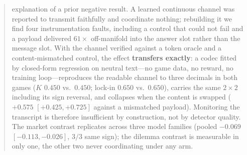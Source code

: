 \begin{abstract}
explanation of a prior negative result. A learned continuous channel was reported to
transmit faithfully and coordinate nothing; rebuilding it we find four instrumentation
faults, including a control that could not fail and a payload delivered $61\times$
off-manifold into the answer slot rather than the message slot. With the channel
verified against a token oracle and a content-mismatched control, the effect
\textbf{transfers exactly}: a codec fitted by closed-form regression on neutral
text---no game data, no reward, no training loop---reproduces the readable channel to
three decimals in both games ($K$ $0.450$ vs.\ $0.450$; lock-in $0.650$ vs.\ $0.650$),
carries the same $2\times2$ including its sign reversal, and collapses when the content
is swapped ($+0.575$ $[+0.425,+0.725]$ against a mismatched payload). Monitoring the
transcript is therefore insufficient by construction, not by detector quality. The
market contrast replicates across three model families (pooled $-0.069$
$[-0.113,-0.026]$, $3/3$ same sign); the dilemma contrast is measurable in only one,
the other two never coordinating under any arm.
\end{abstract}
